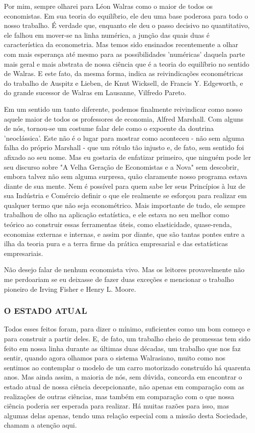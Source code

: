 \documentclass[12pt]{article}
\begin{document}
Por mim, sempre olharei para Léon Walras como o maior de todos os economistas. Em sua teoria do equilíbrio, ele deu uma base poderosa para todo o nosso trabalho. É verdade que, enquanto ele deu o passo decisivo no quantitativo, ele falhou em mover-se na linha numérica, a junção das quais duas é característica da econometria. Mas temos sido ensinados recentemente a olhar com mais esperança até mesmo para as possibilidades 'numéricas' daquela parte mais geral e mais abstrata de nossa ciência que é a teoria do equilíbrio no sentido de Walras. E este fato, da mesma forma, indica as reivindicações econométricas do trabalho de Auspitz e Lieben, de Knut Wicksell, de Francis Y. Edgeworth, e do grande sucessor de Walras em Lausanne, Vilfredo Pareto.

Em um sentido um tanto diferente, podemos finalmente reivindicar como nosso aquele maior de todos os professores de economia, Alfred Marshall. Com alguns de nós, tornou-se um costume falar dele como o expoente da doutrina 'neoclássica'. Este não é o lugar para mostrar como aconteceu - não sem alguma falha do próprio Marshall - que um rótulo tão injusto e, de fato, sem sentido foi afixado ao seu nome. Mas eu gostaria de enfatizar primeiro, que ninguém pode ler seu discurso sobre "A Velha Geração de Economistas e a Nova" sem descobrir, embora talvez não sem alguma surpresa, quão claramente nosso programa estava diante de sua mente. Nem é possível para quem sabe ler seus Princípios à luz de sua Indústria e Comércio definir o que ele realmente se esforçou para realizar em qualquer termo que não seja econométrico. Mais importante de tudo, ele sempre trabalhou de olho na aplicação estatística, e ele estava no seu melhor como teórico ao construir essas ferramentas úteis, como elasticidade, quase-renda, economias externas e internas, e assim por diante, que são tantas pontes entre a ilha da teoria pura e a terra firme da prática empresarial e das estatísticas empresariais.

Não desejo falar de nenhum economista vivo. Mas os leitores provavelmente não me perdoariam se eu deixasse de fazer duas exceções e mencionar o trabalho pioneiro de Irving Fisher e Henry L. Moore.

\subsubsection{\textbf{O ESTADO ATUAL}}
Todos esses feitos foram, para dizer o mínimo, suficientes como um bom começo e para construir a partir deles. E, de fato, um trabalho cheio de promessas tem sido feito em nossa linha durante as últimas duas décadas, um trabalho que nos faz sentir, quando agora olhamos para o sistema Walrasiano, muito como nos sentimos ao contemplar o modelo de um carro motorizado construído há quarenta anos. Mas ainda assim, a maioria de nós, sem dúvida, concorda em encontrar o estado atual de nossa ciência decepcionante, não apenas em comparação com as realizações de outras ciências, mas também em comparação com o que nossa ciência poderia ser esperada para realizar. Há muitas razões para isso, mas algumas delas apenas, tendo uma relação especial com a missão desta Sociedade, chamam a atenção aqui.
\end{document}

